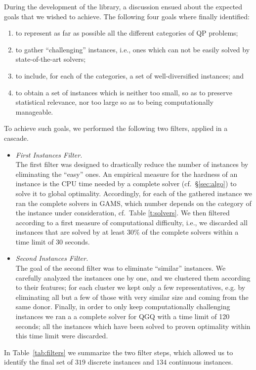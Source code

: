 During the development of the library, a discussion ensued about
the expected goals that we wished to achieve. The following four goals
where finally identified:
%
\begin{enumerate}
 \item to represent as far as possible all the different categories of QP
       problems;
 \item to gather ``challenging'' instances, i.e., ones which can not be easily
       solved by  state-of-the-art solvers;
 \item to include, for each of the categories, a set of well-diversified
       instances; and
 \item to obtain a set of instances which is neither too small, so as to
       preserve statistical relevance, nor too large so as to being
       computationally manageable.
\end{enumerate}
%
To achieve such goals, we performed the following two filters, applied in
a cascade.
%
\begin{itemize}
 \item \emph{First Instances Filter.}\\
       The first filter was designed to drastically reduce the number of
       instances by eliminating the ``easy'' ones. An empirical measure
       for the hardness of an instance is the CPU time needed by a
       complete solver (cf.~\S\ref{sec:algo}) to solve it to
       global optimality. Accordingly, for each of the gathered instance we
       ran the complete solvers in GAMS, which number depends on the category
       of the instance under consideration, cf.~Table \ref{t:solvers}.
       We then filtered according to a first
       measure of computational difficulty, i.e., we discarded all instances
       that are solved by at least 30\% of the complete solvers within a time
       limit of 30 seconds.
 \item \emph{Second Instances Filter.}\\
       The goal of the second filter was to eliminate ``similar'' instances.
       We carefully analyzed the instances one by one, and we clustered them
       according to their features; for each cluster we kept only a few
       representatives, e.g. by eliminating all but a few of those with very similar size and coming from the same donor. Finally, in order to only
       keep computationally challenging instances we ran a a complete solver for QGQ with a time limit of 120 seconds; all the
       instances which have been solved to proven optimality within this time limit
       were discarded.
\end{itemize}
%
In Table~\ref{tab:filters} we summarize the two filter steps, which
allowed us to identify the final set of $319$ discrete instances and
$134$ continuous instances.

